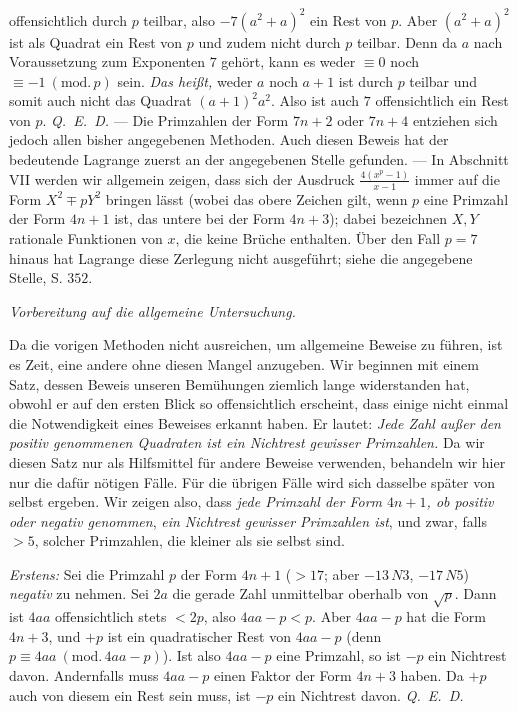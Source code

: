 offensichtlich durch $p$ teilbar, also $-7(a^2+a)^2$ ein Rest von $p$. Aber $(a^2+a)^2$ ist als Quadrat ein Rest von $p$ und zudem nicht durch $p$ teilbar. Denn da $a$ nach Voraussetzung zum Exponenten $7$ gehört, kann es weder $\equiv0$ noch $\equiv-1\ (\mathrm{mod.}\,p)$ sein. \textit{Das heißt,} weder $a$ noch $a+1$ ist durch $p$ teilbar und somit auch nicht das Quadrat $(a+1)^2a^2$. Also ist auch $7$ offensichtlich ein Rest von $p$. \mbox{\textit{Q. E. D.}} --- Die Primzahlen der Form $7n+2$ oder $7n+4$ entziehen sich jedoch allen bisher angegebenen Methoden. Auch diesen Beweis hat der bedeutende Lagrange zuerst an der angegebenen Stelle gefunden. --- In Abschnitt VII werden wir allgemein zeigen, dass sich der Ausdruck $\frac{4(x^p-1)}{x-1}$ immer auf die Form $X^2\mp pY^2$ bringen lässt (wobei das obere Zeichen gilt, wenn $p$ eine Primzahl der Form $4n+1$ ist, das untere bei der Form $4n+3$); dabei bezeichnen $X,Y$ rationale Funktionen von $x$, die keine Brüche enthalten. Über den Fall $p=7$ hinaus hat Lagrange diese Zerlegung nicht ausgeführt; siehe die angegebene Stelle, S. $352$.

\begin{center}\textit{Vorbereitung auf die allgemeine Untersuchung.}\end{center}

Da die vorigen Methoden nicht ausreichen, um allgemeine Beweise zu führen, ist es Zeit, eine andere ohne diesen Mangel anzugeben. Wir beginnen mit einem Satz, dessen Beweis unseren Bemühungen ziemlich lange widerstanden hat, obwohl er auf den ersten Blick so offensichtlich erscheint, dass einige nicht einmal die Notwendigkeit eines Beweises erkannt haben. Er lautet: \textit{Jede Zahl außer den positiv genommenen Quadraten ist ein Nichtrest gewisser Primzahlen.} Da wir diesen Satz nur als Hilfsmittel für andere Beweise verwenden, behandeln wir hier nur die dafür nötigen Fälle. Für die übrigen Fälle wird sich dasselbe später von selbst ergeben. Wir zeigen also, dass \textit{jede Primzahl der Form $4n+1$, ob positiv oder negativ genommen}, \textit{ein Nichtrest gewisser Primzahlen ist}, und zwar, falls $>5$, solcher Primzahlen, die kleiner als sie selbst sind.

\textit{Erstens:} Sei die Primzahl $p$ der Form $4n+1$ ($>17$; aber $-13\,N3$, $-17\,N5$) \textit{negativ} zu nehmen. Sei $2a$ die gerade Zahl unmittelbar oberhalb von $\surd p$. Dann ist $4aa$ offensichtlich stets $<2p$, also $4aa-p<p$. Aber $4aa-p$ hat die Form $4n+3$, und $+p$ ist ein quadratischer Rest von $4aa-p$ (denn $p\equiv4aa\ (\mathrm{mod.}\,4aa-p)$). Ist also $4aa-p$ eine Primzahl, so ist $-p$ ein Nichtrest davon. Andernfalls muss $4aa-p$ einen Faktor der Form $4n+3$ haben. Da $+p$ auch von diesem ein Rest sein muss, ist $-p$ ein Nichtrest davon. \mbox{\textit{Q. E. D.}}

